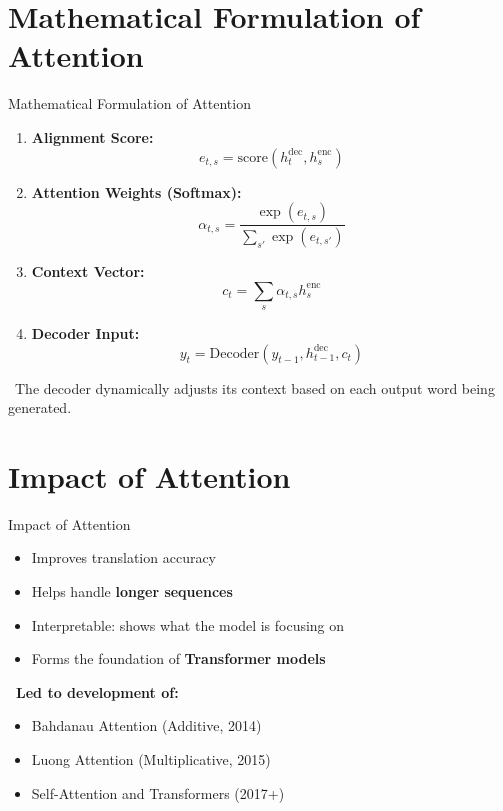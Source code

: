 \section{Mathematical Formulation of Attention}
\begin{frame}{Mathematical Formulation of Attention}
    \begin{enumerate}
        \item \textbf{Alignment Score:}
        \[
            e_{t,s} = \text{score}(h_t^{\text{dec}}, h_s^{\text{enc}})
        \]
        \item \textbf{Attention Weights (Softmax):}
        \[
            \alpha_{t,s} = \frac{\exp(e_{t,s})}{\sum_{s'} \exp(e_{t,s'})}
        \]
        \item \textbf{Context Vector:}
        \[
            c_t = \sum_s \alpha_{t,s} h_s^{\text{enc}}
        \]
        \item \textbf{Decoder Input:}
        \[
            y_t = \text{Decoder}(y_{t-1}, h_{t-1}^{\text{dec}}, c_t)
        \]
    \end{enumerate}
    \vspace{1em}
    \textcolor{green!50!black}{\faCheckCircle\ The decoder dynamically adjusts its context based on each output word being generated.}
\end{frame}


\section{Impact of Attention}
\begin{frame}{Impact of Attention}
    \begin{itemize}
        \item[\faCheckCircle] Improves translation accuracy
        \item[\faCheckCircle] Helps handle \textbf{longer sequences}
        \item[\faCheckCircle] Interpretable: shows what the model is focusing on
        \item[\faCheckCircle] Forms the foundation of \textbf{Transformer models}
    \end{itemize}
    \vspace{1em}
    \textbf{\faThumbTack\ Led to development of:}
    \begin{itemize}
        \item Bahdanau Attention (Additive, 2014)
        \item Luong Attention (Multiplicative, 2015)
        \item Self-Attention and Transformers (2017+)
    \end{itemize}
\end{frame}


